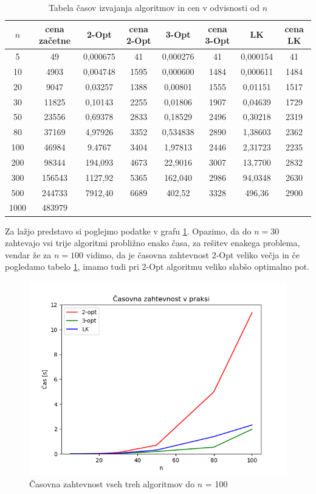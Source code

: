 \documentclass[12pt, a4paper]{article}
\begin{document}
\begin{table}[!h]
\begin{tabular}{|c|c|c|c|c|c|c|c|}
\hline
$n$&cena začetne&2-Opt&cena 2-Opt&3-Opt&cena 3-Opt&LK&cena LK\\\hline
5&49&0,000675&41&0,000276&41&0,000154&41\\\hline
10&4903&0,004748&1595&0,000600&1484&0,000611&1484\\\hline
20&9047&0,03257&1388&0,00801&1555&0,01151&1517\\\hline
30&11825&0,10143&2255&0,01806&1907&0,04639&1729\\\hline
50&23556&0,69378&2833&0,18529&2496&0,30218&2319\\\hline
80&37169&4,97926&3352&0,534838&2890&1,38603&2362\\\hline
100&46984&9.4767&3404&1,97813&2446&2,31723&2235\\\hline
200&98344&194,093&4673&22,9016&3007&13,7700&2832\\\hline
300&156543&1127,92&5365&162,040&2986&94,0348&2630\\\hline
500&244733&7912,40&6689&402,52&3328&496,36&2900\\\hline
1000&483979&&&&&&\\\hline
\end{tabular}
\caption{Tabela časov izvajanja algoritmov in cen v odvisnosti od $n$}
\label{tabela_casov}
\end{table}

Za lažjo predstavo si poglejmo podatke v grafu \ref{casovna_do_100}. Opazimo, da do $n=30$ zahtevajo vsi trije algoritmi probližno enako časa, za rešitev enakega problema, vendar že za $n=100$ vidimo, da je časovna zahtevnost 2-Opt veliko večja in če pogledamo tabelo \ref{tabela_casov}, imamo tudi pri 2-Opt algoritmu veliko slabšo optimalno pot.

\begin{figure}[!h]
 \begin{center}
  \includegraphics[width=12 cm]{casovna_zahtevnost_do_100.png}
  \caption{Časovna zahtevnost vseh treh algoritmov do $n$ = 100}
  \label{casovna_do_100}
\end{center}
\end{figure}
\end{document}
